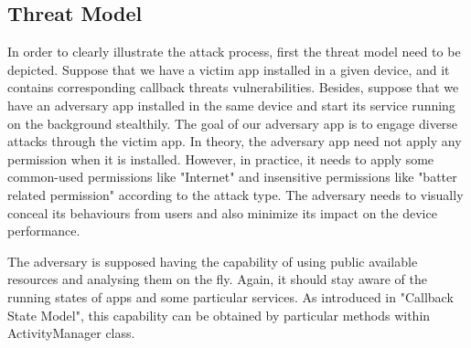\documentclass{sig-alternate-05-2015}
\begin{document}
\subsection{Threat Model}
In order to clearly illustrate the attack process, first the threat model need to be depicted.
Suppose that we have a victim app installed in a given device, and it contains corresponding callback threats vulnerabilities. Besides, suppose that we have an adversary app installed in the same device and start its service running on the background stealthily. The goal of our adversary app is to engage diverse attacks through the victim app. In theory, the adversary app need not apply any permission when it is installed. However, in practice, it needs to apply some  common-used permissions like "Internet" and insensitive permissions like "batter related permission" according to the attack type. The adversary needs to visually conceal its behaviours from users and also minimize its impact on the device performance. 

The adversary is supposed having the capability of using public available resources and analysing them on the fly. Again, it should stay aware of the running states of apps and some particular services. As introduced in "Callback State Model", this capability can be obtained by particular methods within ActivityManager class.

%
\end{document}
